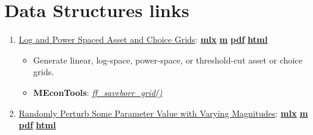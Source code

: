 \documentclass[
]{book}
\providecommand{\tightlist}{%
  \setlength{\itemsep}{0pt}\setlength{\parskip}{0pt}}
\begin{document}
\hypertarget{data-structures-links}{%
\section{Data Structures links}\label{data-structures-links}}

\begin{enumerate}
\def\labelenumi{\arabic{enumi}.}
\tightlist
\item
  \href{https://fanwangecon.github.io/MEconTools/MEconTools/doc/generate/htmlpdfm/fx_saveborr_grid.html}{Log and Power Spaced Asset and Choice Grids}: \href{https://github.com/FanWangEcon/MEconTools/blob/master/MEconTools/doc/generate/fx_saveborr_grid.mlx}{\textbf{mlx}} \textbar{} \href{https://github.com/FanWangEcon/MEconTools/blob/master/MEconTools/doc/generate/htmlpdfm/fx_saveborr_grid.m}{\textbf{m}} \textbar{} \href{https://github.com/FanWangEcon/MEconTools/blob/master/MEconTools/doc/generate/htmlpdfm/fx_saveborr_grid.pdf}{\textbf{pdf}} \textbar{} \href{https://fanwangecon.github.io/MEconTools/MEconTools/doc/generate/htmlpdfm/fx_saveborr_grid.html}{\textbf{html}}

  \begin{itemize}
  \tightlist
  \item
    Generate linear, log-space, power-space, or threshold-cut asset or choice grids.
  \item
    \textbf{MEconTools}: \emph{\href{https://github.com/FanWangEcon/MEconTools/blob/master/MEconTools/generate/ff_saveborr_grid.m}{ff\_saveborr\_grid()}}
  \end{itemize}
\item
  \href{https://fanwangecon.github.io/MEconTools/MEconTools/doc/generate/htmlpdfm/fx_perturb_logn.html}{Randomly Perturb Some Parameter Value with Varying Magnitudes}: \href{https://github.com/FanWangEcon/MEconTools/blob/master/MEconTools/doc/generate/fx_perturb_logn.mlx}{\textbf{mlx}} \textbar{} \href{https://github.com/FanWangEcon/MEconTools/blob/master/MEconTools/doc/generate/htmlpdfm/fx_perturb_logn.m}{\textbf{m}} \textbar{} \href{https://github.com/FanWangEcon/MEconTools/blob/master/MEconTools/doc/generate/htmlpdfm/fx_perturb_logn.pdf}{\textbf{pdf}} \textbar{} \href{https://fanwangecon.github.io/MEconTools/MEconTools/doc/generate/htmlpdfm/fx_perturb_logn.html}{\textbf{html}}


\end{enumerate}
\end{document}
